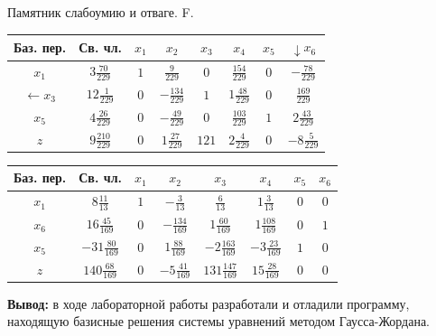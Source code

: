 \documentclass[a4paper,14pt]{extarticle}
\begin{document}
    Памятник слабоумию и отваге. F.
    \begin{tabular}{|c|c|c|c|c|c|c|c|}
        \hline
        Баз. пер.        & Св. чл.            & $x_1$ & $x_2$              & $x_3$ & $x_4$             & $x_5$ & $\downarrow x_6$   \\
        \hline
        $x_1$            & $ 3\frac{70}{229}$ & $1$   & $\frac{9}{229}$    & $0$   & $\frac{154}{229}$ & $0$   & $- \frac{78}{229}$ \\
        \hline
        $\leftarrow x_3$ & $12\frac{1}{229}$  & $0$   & $-\frac{134}{229}$ & $1$   & $1\frac{48}{229}$ & $0$   & $\frac{169}{229}$  \\
        \hline
        $x_5$            & $4\frac{26}{229}$  & $0$   & $-\frac{49}{229}$  & $0$   & $\frac{103}{229}$ & $1$   & $2\frac{43}{229}$  \\
        \hline
        $z$              & $9\frac{210}{229}$ & $0$   & $1\frac{27}{229}$  & $121$ & $2\frac{4}{229}$  & $0$   & $-8\frac{5}{229}$  \\
        \hline
    \end{tabular}\bigbreak
    \begin{tabular}{|c|c|c|c|c|c|c|c|}
        \hline
        Баз. пер. & Св. чл.             & $x_1$ & $x_2$              & $x_3$                & $x_4$              & $x_5$ & $x_6$ \\
        \hline
        $x_1$     & $ 8\frac{11}{13}$   & $1$   & $-\frac{3}{13}$    & $\frac{6}{13}$       & $1\frac{3}{13}$    & $0$   & $0$   \\
        \hline
        $x_6$     & $16\frac{45}{169}$  & $0$   & $-\frac{134}{169}$ & $1\frac{60}{169}$    & $1\frac{108}{169}$ & $0$   & $1$   \\
        \hline
        $x_5$     & $-31\frac{80}{169}$ & $0$   & $1\frac{88}{169}$  & $-2\frac{163}{169}$  & $-3\frac{23}{169}$ & $1$   & $0$   \\
        \hline
        $z$       & $140\frac{68}{169}$ & $0$   & $-5\frac{41}{169}$ & $131\frac{147}{169}$ & $15\frac{28}{169}$ & $0$   & $0$   \\
        \hline
    \end{tabular}\bigbreak
\fi

\textbf{Вывод: } в ходе лабораторной работы разработали и отладили программу, находящую
базисные решения системы уравнений методом Гаусса-Жордана.
\end{document}
